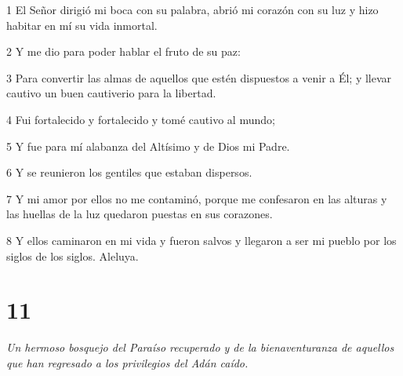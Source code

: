 \par 1 El Señor dirigió mi boca con su palabra, abrió mi corazón con su luz y hizo habitar en mí su vida inmortal.
\par 2 Y me dio para poder hablar el fruto de su paz:
\par 3 Para convertir las almas de aquellos que estén dispuestos a venir a Él; y llevar cautivo un buen cautiverio para la libertad.
\par 4 Fui fortalecido y fortalecido y tomé cautivo al mundo;
\par 5 Y fue para mí alabanza del Altísimo y de Dios mi Padre.
\par 6 Y se reunieron los gentiles que estaban dispersos.
\par 7 Y mi amor por ellos no me contaminó, porque me confesaron en las alturas y las huellas de la luz quedaron puestas en sus corazones.
\par 8 Y ellos caminaron en mi vida y fueron salvos y llegaron a ser mi pueblo por los siglos de los siglos. Aleluya.

\chapter{11}

\par \textit{Un hermoso bosquejo del Paraíso recuperado y de la bienaventuranza de aquellos que han regresado a los privilegios del Adán caído.}

